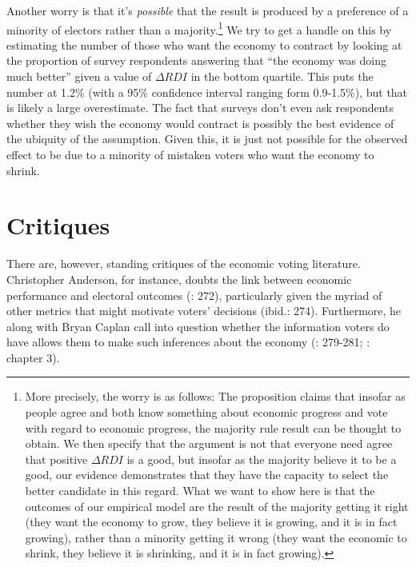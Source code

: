 \documentclass[11pt]{article}
\begin{document}
Another worry is that it's \emph{possible} that the result is produced by a preference of a minority of electors rather than a majority.\footnote{More precisely, the worry is as follows: The proposition claims that insofar as people agree and both know something about economic progress and vote with regard to economic progress, the majority rule result can be thought to obtain. We then specify that the argument is not that everyone need agree that positive $\Delta RDI$ is a good, but insofar as the majority believe it to be a good, our evidence demonstrates that they have the capacity to select the better candidate in this regard. What we want to show here is that the outcomes of our empirical model are the result of the majority getting it right (they want the economy to grow,  they believe it is growing, and it is in fact growing), rather than a minority getting it wrong (they want the economic to shrink, they believe it is shrinking, and it is in fact growing).} We try to get a handle on this by estimating the number of those who want the economy to contract by looking at the proportion of survey respondents answering  that ``the economy was doing much better'' given a value of $\Delta RDI$ in the bottom quartile. This puts the number at 1.2\% (with a 95\% confidence interval ranging form 0.9-1.5\%), but that is likely a large overestimate. %
The fact that surveys don't even ask respondents whether they wish the economy would contract is possibly the best evidence of the ubiquity of the assumption. Given this, it is just not possible for the observed effect to be due to a minority of mistaken voters who want the economy to shrink.


\section{Critiques}

There are, however, standing critiques of the economic voting literature.  Christopher Anderson, for instance, doubts the link between economic performance and electoral outcomes (\cite{Anderson07}: 272), particularly given the myriad of other metrics that might motivate voters' decisions (ibid.: 274). Furthermore, he along with Bryan Caplan call into question whether the information voters do have allows them to make such inferences about the economy (\cite{Anderson07}: 279-281; \cite{Caplan2006}: chapter 3).
\end{document}
